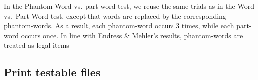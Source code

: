 \documentclass[
]{article}
\begin{document}
In the Phantom-Word vs.~part-word test, we reuse the same trials as in
the Word vs.~Part-Word test, except that words are replaced by the
corresponding phantom-words. As a result, each phantom-word occurs 3
times, while each part-word occurs once. In line with Endress \&
Mehler's results, phantom-words are treated as legal items

\hypertarget{print-testable-files}{%
\subsection{Print testable files}\label{print-testable-files}}

  
\end{document}
